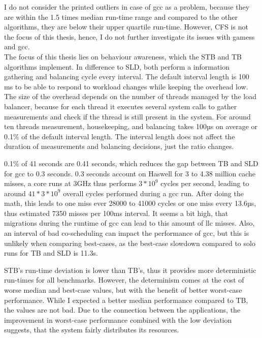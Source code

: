 I do not consider the printed outliers in case of gcc as a problem, because
they are within the 1.5 times median run-time range and compared to the other
algorithms, they are below their upper quartile run-time.
However, CFS is not the focus of this thesis, hence, I do not further
investigate its issues with gamess and gcc.
\\

The focus of this thesis lies on behaviour awareness, which the STB and TB
algorithms implement.
In difference to SLD, both perform a information gathering and balancing cycle
every interval.
The default interval length is 100 ms to be able to respond to workload
changes while keeping the overhead low.
The size of the overhead depends on the number of threads managed by the load
balancer, because for each thread it executes several system calls to gather
measurements and check if the thread is still present in the system.
For around ten threads measurement, housekeeping, and balancing takes 100µs on
average or 0.1\% of the default interval length.
The interval length does not affect the duration of measurements and balancing
decisions, just the ratio changes.


0.1\% of 41 seconds are 0.41 seconds, which reduces the gap between TB and SLD
for gcc to 0.3 seconds.
0.3 seconds account on Haswell for 3 to 4.38 million cache misses, a core runs
at 3GHz thus performs $3* 10^9$ cycles per second, leading to around $41 * 3 *
10^9$ overall cycles performed during a gcc run.
After doing the math, this leads to one miss ever 28000 to 41000 cycles or one
miss every 13.6µs, thus estimated 7350 misses per 100ms interval.
It seems a bit high, that migrations during the runtime of gcc can lead to this
amount of \gls{llc} misses.
Also, an interval of bad co-scheduling can impact the performance of gcc, but
this is unlikely when comparing best-cases, as the best-case slowdown compared
to solo runs for TB and SLD is 11.3s.


STB's run-time deviation is lower than TB's, thus it provides more
deterministic run-times for all benchmarks.
However, the determinism comes at the cost of worse median and best-case
values, but with the benefit of better worst-case performance.
While I expected a better median performance compared to TB, the values are not
bad.
Due to the connection between the applications, the improvement in worst-case
performance combined with the low deviation suggests, that the system fairly
distributes its resources.


